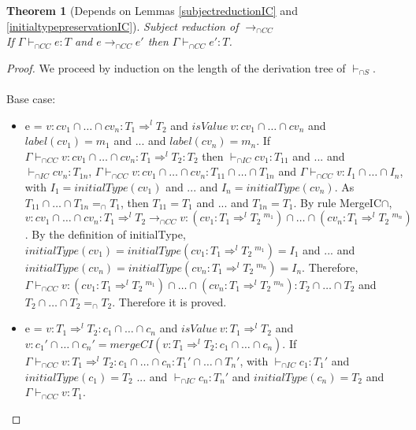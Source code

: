 \documentclass[a4paper]{article}
\newtheorem{theorem}{Theorem}
\begin{document}
\begin{theorem}[Depends on Lemmas \ref{subjectreductionIC} and \ref{initialtypepreservationIC}]
\label{theorem2}
Subject reduction of $\longrightarrow_{\cap CC}$\\
If $\Gamma \vdash_{\cap CC} e : T$ and $e \longrightarrow_{\cap CC} e'$ then $\Gamma \vdash_{\cap CC} e' : T$.
\end{theorem}
\begin{proof}
We proceed by induction on the length of the derivation tree of $\vdash_{\cap S}$.\\\\
Base case:
\begin{itemize}
    \item e = $v : cv_1 \cap \ldots \cap cv_n : T_1 \Rightarrow^l T_2$ and $isValue\ v : cv_1 \cap \ldots \cap cv_n$ and $label(cv_1) = m_1$ and ... and $label(cv_n) = m_n$.
    If $\Gamma \vdash_{\cap CC} v : cv_1 \cap \ldots \cap cv_n : T_1 \Rightarrow^l T_2 : T_2$ then $\vdash_{\cap IC} cv_1 : T_{11}$ and ... and $\vdash_{\cap IC} cv_n : T_{1n}$, $\Gamma \vdash_{\cap CC} v : cv_1 \cap \ldots \cap cv_n : T_{11} \cap \ldots \cap T_{1n}$ and $\Gamma \vdash_{\cap CC} v : I_1 \cap \ldots \cap I_n$, with $I_1 = initialType(cv_1)$ and ... and $I_n = initialType(cv_n)$.
    As $T_{11} \cap \ldots \cap T_{1n} =_{\cap} T_1$, then $T_{11} = T_1$ and ... and $T_{1n} = T_1$.
    By rule MergeIC$\cap$, $v : cv_1 \cap \ldots \cap cv_n : T_1 \Rightarrow^l T_2 \longrightarrow_{\cap CC} v : (cv_1 : T_1 \Rightarrow^l T_2\ ^{m_1}) \cap \ldots \cap (cv_n : T_1 \Rightarrow^l T_2\ ^{m_n})$.
    By the definition of initialType, $initialType(cv_1) = initialType(cv_1 : T_1 \Rightarrow^l T_2\ ^{m_1}) = I_1$ and ... and $initialType(cv_n) = initialType(cv_n : T_1 \Rightarrow^l T_2\ ^{m_n}) = I_n$.
    Therefore, $\Gamma \vdash_{\cap CC} v : (cv_1 : T_1 \Rightarrow^l T_2\ ^{m_1}) \cap \ldots \cap (cv_n : T_1 \Rightarrow^l T_2\ ^{m_n}) : T_2 \cap \ldots \cap T_2$ and $T_2 \cap \ldots \cap T_2 =_{\cap} T_2$.
    Therefore it is proved.
    \item e = $v : T_1 \Rightarrow^l T_2 : c_1 \cap \ldots \cap c_n$ and $isValue\ v : T_1 \Rightarrow^l T_2$ and $v : c_1' \cap \ldots \cap c_n' = mergeCI (v : T_1 \Rightarrow^l T_2 : c_1 \cap \ldots \cap c_n)$.
    If $\Gamma \vdash_{\cap CC} v : T_1 \Rightarrow^l T_2 : c_1 \cap \ldots \cap c_n : T_1' \cap \ldots \cap T_n'$, with $\vdash_{\cap IC} c_1 : T_1'$ and $initialType(c_1) = T_2$ ... and $\vdash_{\cap IC} c_n : T_n'$ and $initialType(c_n) = T_2$ and $\Gamma \vdash_{\cap CC} v : T_1$.

\end{itemize}
\end{proof}
\end{document}
